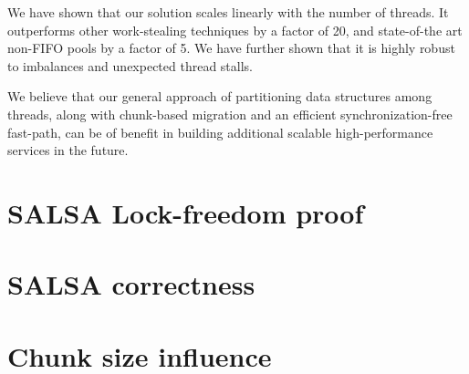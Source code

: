 \documentclass[11pt]{article}
\theoremstyle{plain}
\begin{document}
We have shown that our solution scales linearly with the number
of threads. It outperforms other work-stealing techniques by a
factor of 20, and state-of-the art non-FIFO pools by a factor of 5.
We have further shown that it is highly robust to imbalances and
unexpected thread stalls.

We believe that our general approach of partitioning data structures
among threads, along with chunk-based migration and an efficient
synchronization-free fast-path, can be of benefit in building
additional scalable high-performance services in the future.



\pagebreak \small

\begin{appendix}

\section{SALSA Lock-freedom proof}
\label{appendix:lock-freedom}

\clearpage
\section{SALSA correctness}
\label{appendix:salsa-correctness}

\clearpage
\section{Chunk size influence}
\label{appendix:chunk-size}


\end{appendix}
\end{document}
